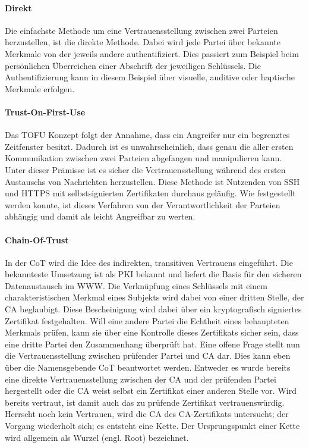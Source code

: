 \paragraph{Direkt}
Die einfachste Methode um eine Vertrauensstellung zwischen zwei Parteien herzustellen, ist die direkte Methode. Dabei wird jede Partei über bekannte Merkmale von der jeweils andere authentifiziert. Dies passiert zum Beispiel beim persönlichen Überreichen einer Abschrift der jeweiligen Schlüssels. Die Authentifizierung kann in diesem Beispiel über visuelle, auditive oder haptische Merkmale erfolgen.

\paragraph{Trust-On-First-Use}
Das \ac{TOFU} Konzept folgt der Annahme, dass ein Angreifer nur ein begrenztes Zeitfenster besitzt. Dadurch ist es unwahrscheinlich, dass genau die aller ersten Kommunikation zwischen zwei Parteien abgefangen und manipulieren kann. Unter dieser Prämisse ist es sicher die Vertrauensstellung während des ersten Austauschs von Nachrichten herzustellen. Diese Methode ist Nutzenden von \ac{SSH} und \acs{HTTPS} mit selbstsignierten Zertifikaten durchaus geläufig. Wie festgestellt werden konnte, ist dieses Verfahren von der Verantwortlichkeit der Parteien abhängig und damit als leicht Angreifbar zu werten\cite{Wendlandt2008}.

\paragraph{Chain-Of-Trust}
In der \ac{CoT} wird die Idee des indirekten, transitiven Vertrauens eingeführt. Die bekannteste Umsetzung ist als \ac{PKI} bekannt und liefert die Basis für den sicheren Datenaustausch im \ac{WWW}. Die Verknüpfung eines Schlüssels mit einem charakteristischen Merkmal eines Subjekts wird dabei von einer dritten Stelle, der \ac{CA} beglaubigt. Diese Bescheinigung wird dabei über ein kryptografisch signiertes Zertifikat festgehalten. Will eine andere Partei die Echtheit eines behaupteten Merkmals prüfen, kann sie über eine Kontrolle dieses Zertifikats sicher sein, dass eine dritte Partei den Zusammenhang überprüft hat. Eine offene Frage stellt nun die Vertrauensstellung zwischen prüfender Partei und \ac{CA} dar. Dies kann eben über die Namensgebende \ac{CoT} beantwortet werden. Entweder es wurde bereits eine direkte Vertrauensstellung zwischen der \ac{CA} und der prüfenden Partei hergestellt oder die \ac{CA} weist selbst ein Zertifikat einer anderen Stelle vor. Wird bereits vertraut, ist damit auch das zu prüfende Zertifikat vertrauenswürdig. Herrscht noch kein Vertrauen, wird die \ac{CA} des CA-Zertifikats untersucht; der Vorgang wiederholt sich; es entsteht eine Kette. Der Ursprungspunkt einer Kette wird allgemein als Wurzel (engl. Root) bezeichnet\cite[p. 423 ff.]{Eckert2013}.  
